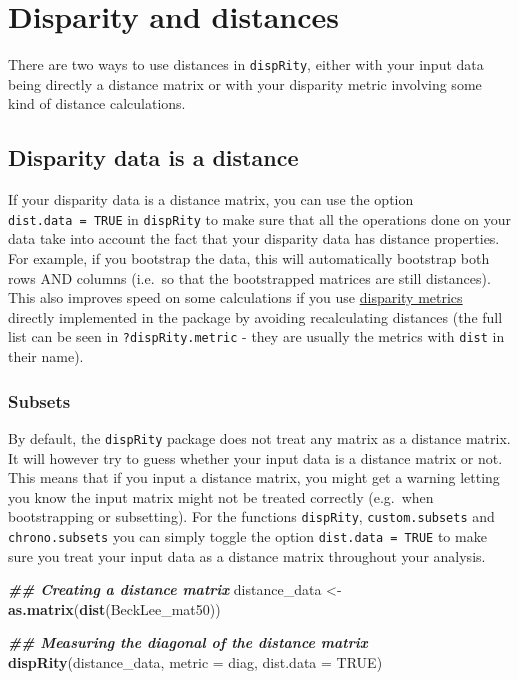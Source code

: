 \documentclass[
]{book}
\newenvironment{Shaded}{\begin{snugshade}}{\end{snugshade}}
\newcommand{\AttributeTok}[1]{\textcolor[rgb]{0.13,0.29,0.53}{#1}}
\newcommand{\ConstantTok}[1]{\textcolor[rgb]{0.56,0.35,0.01}{#1}}
\newcommand{\DocumentationTok}[1]{\textcolor[rgb]{0.56,0.35,0.01}{\textbf{\textit{#1}}}}
\newcommand{\FunctionTok}[1]{\textcolor[rgb]{0.13,0.29,0.53}{\textbf{#1}}}
\newcommand{\NormalTok}[1]{#1}
\newcommand{\OtherTok}[1]{\textcolor[rgb]{0.56,0.35,0.01}{#1}}
\begin{document}
\hypertarget{disparity-and-distances}{%
\section{Disparity and distances}\label{disparity-and-distances}}

There are two ways to use distances in \texttt{dispRity}, either with your input data being directly a distance matrix or with your disparity metric involving some kind of distance calculations.

\hypertarget{disparity-data-is-a-distance}{%
\subsection{Disparity data is a distance}\label{disparity-data-is-a-distance}}

If your disparity data is a distance matrix, you can use the option \texttt{dist.data\ =\ TRUE} in \texttt{dispRity} to make sure that all the operations done on your data take into account the fact that your disparity data has distance properties.
For example, if you bootstrap the data, this will automatically bootstrap both rows AND columns (i.e.~so that the bootstrapped matrices are still distances).
This also improves speed on some calculations if you use \protect\hyperlink{disparity-metrics}{disparity metrics} directly implemented in the package by avoiding recalculating distances (the full list can be seen in \texttt{?dispRity.metric} - they are usually the metrics with \texttt{dist} in their name).

\hypertarget{subsets}{%
\subsubsection{Subsets}\label{subsets}}

By default, the \texttt{dispRity} package does not treat any matrix as a distance matrix.
It will however try to guess whether your input data is a distance matrix or not.
This means that if you input a distance matrix, you might get a warning letting you know the input matrix might not be treated correctly (e.g.~when bootstrapping or subsetting).
For the functions \texttt{dispRity}, \texttt{custom.subsets} and \texttt{chrono.subsets} you can simply toggle the option \texttt{dist.data\ =\ TRUE} to make sure you treat your input data as a distance matrix throughout your analysis.

\begin{Shaded}
\begin{Highlighting}[]
\DocumentationTok{\#\# Creating a distance matrix}
\NormalTok{distance\_data }\OtherTok{\textless{}{-}} \FunctionTok{as.matrix}\NormalTok{(}\FunctionTok{dist}\NormalTok{(BeckLee\_mat50))}

\DocumentationTok{\#\# Measuring the diagonal of the distance matrix}
\FunctionTok{dispRity}\NormalTok{(distance\_data, }\AttributeTok{metric =}\NormalTok{ diag, }\AttributeTok{dist.data =} \ConstantTok{TRUE}\NormalTok{)}
\end{Highlighting}
\end{Shaded}
\end{document}
